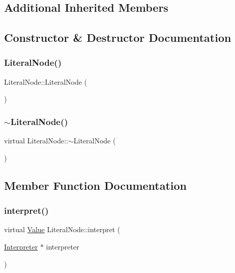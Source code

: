 \subsection*{Additional Inherited Members}


\subsection{Constructor \& Destructor Documentation}
\mbox{\label{classLiteralNode_ae50674f947b26ee018592984c6c6117b}} 
\subsubsection{\texorpdfstring{Literal\+Node()}{LiteralNode()}}
{\footnotesize\ttfamily Literal\+Node\+::\+Literal\+Node (\begin{DoxyParamCaption}{ }\end{DoxyParamCaption})}

\mbox{\label{classLiteralNode_a09793ae51506882eaa8d345eeef90d16}} 
\subsubsection{\texorpdfstring{$\sim$\+Literal\+Node()}{~LiteralNode()}}
{\footnotesize\ttfamily virtual Literal\+Node\+::$\sim$\+Literal\+Node (\begin{DoxyParamCaption}{ }\end{DoxyParamCaption})\hspace{0.3cm}{\ttfamily [virtual]}}



\subsection{Member Function Documentation}
\mbox{\label{classLiteralNode_abb32ed943c6a5b2029a496ac04885b2a}} 
\subsubsection{\texorpdfstring{interpret()}{interpret()}}
{\footnotesize\ttfamily virtual \hyperlink{classValue}{Value} Literal\+Node\+::interpret (\begin{DoxyParamCaption}\item[{\hyperlink{classInterpreter}{Interpreter} $\ast$}]{interpreter }\end{DoxyParamCaption})\hspace{0.3cm}{\ttfamily [virtual]}}



